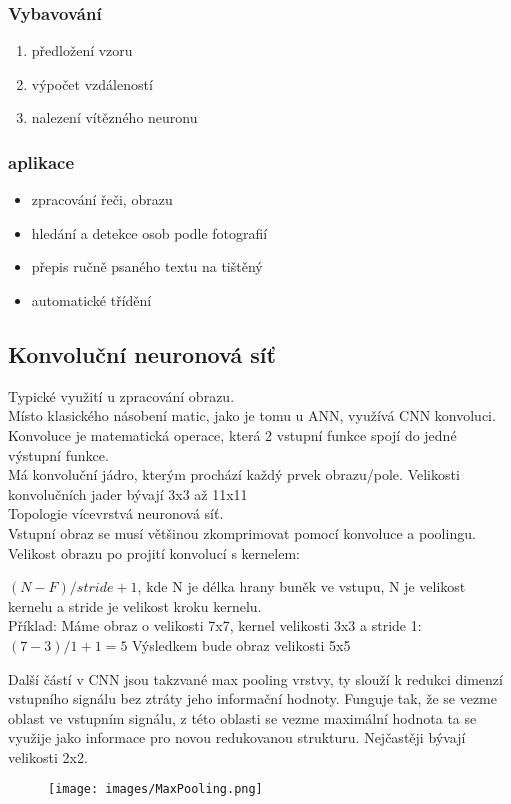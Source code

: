 \subsubsection{Vybavování}
\begin{enumerate}
    \item předložení vzoru
    \item výpočet vzdáleností
    \item nalezení vítězného neuronu
\end{enumerate}

\subsubsection{aplikace}
\begin{itemize}
    \item zpracování řeči, obrazu
    \item hledání a detekce osob podle fotografií
    \item přepis ručně psaného textu na tištěný
    \item automatické třídění
\end{itemize}
\newpage

\subsection{Konvoluční neuronová síť}
Typické využití u zpracování obrazu.\\
Místo klasického násobení matic, jako je tomu u ANN, využívá CNN konvoluci.\\
Konvoluce je matematická operace, která 2 vstupní funkce spojí do jedné výstupní funkce.\\
Má konvoluční jádro, kterým prochází každý prvek obrazu/pole. Velikosti konvolučních jader bývají 3x3 až 11x11\\
Topologie vícevrstvá neuronová síť.\\
Vstupní obraz se musí většinou zkomprimovat pomocí konvoluce a poolingu.\\
Velikost obrazu po projití konvolucí s kernelem:
\begin{center}
    \((N-F)/stride +1\), kde N je délka hrany buněk ve vstupu, N je velikost kernelu a stride je velikost kroku kernelu.\\
    Příklad: Máme obraz o velikosti 7x7, kernel velikosti 3x3 a stride 1:\\
    \((7-3)/1+1 = 5\) Výsledkem bude obraz velikosti 5x5
\end{center}
Další částí v CNN jsou takzvané max pooling vrstvy, ty slouží k redukci dimenzí vstupního signálu bez ztráty jeho informační hodnoty. Funguje tak, že se vezme oblast ve vstupním signálu, z této oblasti se vezme maximální hodnota ta se využije jako informace pro novou redukovanou strukturu. Nejčastěji bývají velikosti 2x2.\\
\begin{figure}[h!]
    \centering
    \texttt{[image: images/MaxPooling.png]}
\end{figure}

